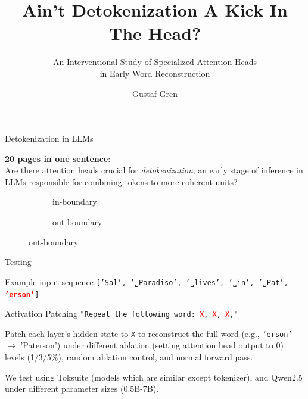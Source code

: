 \documentclass{beamer}
\title{Ain't Detokenization A Kick In The Head?}
\subtitle{An Interventional Study of Specialized Attention Heads \\ in Early Word Reconstruction}
\author{Gustaf Gren}
\date{}
\begin{document}
\begin{frame}
  \titlepage
\end{frame}

\begin{frame}{Detokenization in LLMs}

\textbf{20 pages in one sentence}: \\
Are there attention heads crucial for \textit{detokenization}, an early stage of inference in LLMs responsible for combining tokens to more coherent units?

\begin{figure}[ht]
\centering

\begin{subfigure}{0.45\textwidth}
\centering
{}
\caption{in-boundary}
\end{subfigure}
\hfill
\begin{subfigure}{0.45\textwidth}
\centering
{}
\caption{out-boundary}
\end{subfigure}
\end{figure}

\end{frame}

\begin{frame}{Testing}
\begin{exampleblock}{Example input sequence}
\small{
\texttt{['Sal', '␣Paradiso', '␣lives', '␣in', '␣Pat', \textbf{\textcolor{red}{'erson'}}]}
}
\end{exampleblock}

\bigskip
\begin{block}{Activation Patching}
\texttt{"Repeat the following word: \textcolor{red}{X}, \textcolor{red}{X}, \textcolor{red}{X},"}
\medskip

Patch each layer's hidden state to \texttt{X} to reconstruct the full word (e.g., \texttt{'erson'} $\rightarrow$ 'Paterson') under different ablation (setting attention head output to 0) levels (1/3/5\%), random ablation control, and normal forward pass.
\end{block}

\bigskip
We test using Toksuite (models which are similar except tokenizer), and Qwen2.5 under different parameter sizes (0.5B-7B).
\end{frame}
\end{document}
